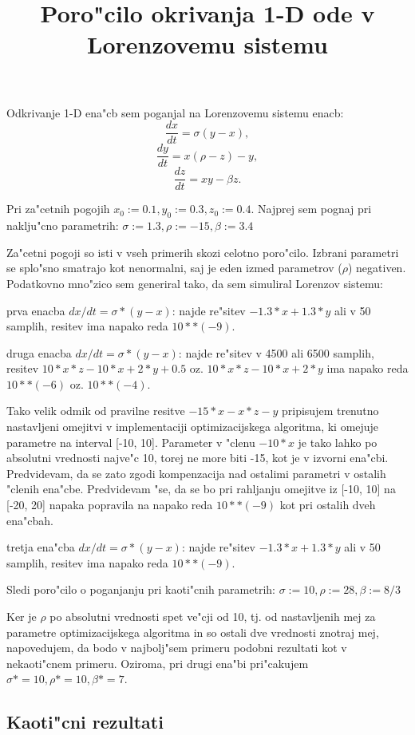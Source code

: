 \documentclass[10pt,a4paper]{article}
\title{Poro"cilo okrivanja 1-D ode v Lorenzovemu sistemu}
\begin{document}
	\maketitle
    
Odkrivanje 1-D ena"cb sem poganjal na Lorenzovemu sistemu enacb:
$$
\frac{dx}{dt} = \sigma (y-x),
$$ $$
\frac{dy}{dt} = x(\rho-z) - y,
$$ $$
\frac{dz}{dt} = xy - \beta z.
$$

Pri za"cetnih pogojih $x_0:=0.1, y_0:=0.3, z_0:=0.4$.
Najprej sem pognaj pri naklju"cno parametrih:
$\sigma:=1.3, \rho:=-15, \beta:=3.4$

Za"cetni pogoji so isti v vseh primerih skozi celotno poro"cilo.
Izbrani parametri se splo"sno smatrajo kot nenormalni, saj je eden izmed parametrov
($\rho$) negativen.
Podatkovno mno"zico sem generiral tako, da sem simuliral Lorenzov sistemu:

prva enacba  $dx/dt = \sigma*(y-x)$: najde re"sitev 
$ -1.3*x + 1.3*y$ ali 
v 50 samplih, resitev ima napako reda $10**(-9)$.


druga enacba  $dx/dt = \sigma*(y-x)$: najde re"sitev v 4500 ali 6500 samplih, resitev 
$10*x*z -10*x +2*y +0.5$ oz. $10*x*z -10*x +2*y$ ima napako
reda $10**(-6)$ oz. $10**(-4)$. 

Tako velik odmik od pravilne resitve  
$-15*x-x*z-y$ pripisujem trenutno nastavljeni omejitvi v implementaciji optimizacijskega
algoritma, ki omejuje parametre na interval [-10, 10]. Parameter v "clenu $-10*x$ je tako
lahko po absolutni vrednosti najve"c 10, torej ne more biti -15, kot je v izvorni ena"cbi.
Predvidevam, da se zato zgodi kompenzacija nad ostalimi parametri v ostalih "clenih ena"cbe.
Predvidevam "se, da se bo pri rahljanju omejitve iz [-10, 10] na [-20, 20] napaka popravila
na napako reda $10**(-9)$ kot pri ostalih dveh ena"cbah.

tretja ena"cba  $dx/dt = \sigma*(y-x)$: najde re"sitev 
$ -1.3*x + 1.3*y$ ali 
v 50 samplih, resitev ima napako
reda $10**(-9)$.

Sledi poro"cilo o poganjanju pri kaoti"cnih parametrih:
$\sigma:=10, \rho:=28, \beta:=8/3$

Ker je $\rho$ po absolutni vrednosti spet ve"cji od 10, tj. od nastavljenih 
mej za parametre optimizacijskega algoritma in so ostali dve vrednosti 
znotraj mej, napovedujem, da bodo v najbolj"sem primeru podobni rezultati kot 
v nekaoti"cnem primeru. Oziroma, pri drugi ena"bi pri"cakujem 
$\sigma* = 10, \rho*= 10, \beta*=7$. 


\subsection{Kaoti"cni rezultati}
\end{document}
